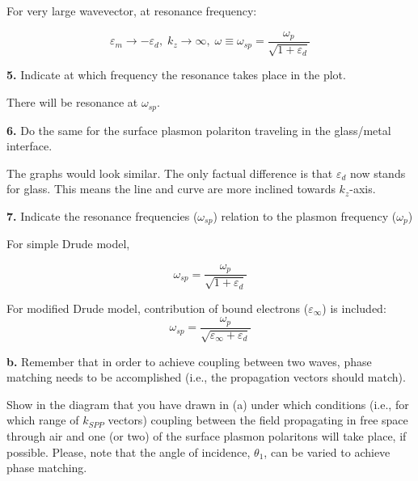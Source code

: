 \documentclass[11pt,a4paper]{article}
\begin{document}
For very large wavevector, at resonance frequency:

\begin{equation}
    \varepsilon_m \to - \varepsilon_d, \; k_z \to \infty, \; \omega \equiv \omega_{sp} = \frac{\omega_p}{\sqrt{1+\varepsilon_d}}
\end{equation}

\begin{displayquote}
    \textbf{5.}  Indicate at which frequency the resonance takes place in the plot. 
    \end{displayquote}

    There will be resonance at $\omega_{sp}$.
    
    \begin{displayquote}
    \textbf{6.}  Do the same for the surface plasmon polariton traveling in the
glass/metal interface.
\end{displayquote}
The graphs would look similar. The only factual difference is that $\varepsilon_d$ now stands for glass. This means the line and curve are more inclined towards $k_z$-axis.

\begin{displayquote}
    \textbf{7.}  Indicate the resonance frequencies ($\omega_{sp}$) relation to the plasmon frequency ($\omega_p$)
\end{displayquote}
For simple Drude model,

\begin{equation}
    \omega_{sp} = \frac{\omega_p}{\sqrt{1+\varepsilon_d}}
\end{equation}

For modified Drude model, contribution of bound electrons ($\varepsilon_{\infty}$)  is included:
\begin{equation}
      \omega_{sp} = \frac{\omega_p}{\sqrt{\varepsilon_{\infty}+\varepsilon_d}}
\end{equation}

\textbf{b. }Remember that in order to achieve coupling between two waves, phase matching needs to be accomplished (i.e., the propagation vectors should match).



\begin{displayquote}
     Show in the diagram that you have drawn in (a) under which conditions (i.e., for which range of $k_{SPP}$ vectors) coupling between the field propagating in free space through air and one (or two) of the surface plasmon polaritons will take place, if possible. Please, note that the angle of incidence, $\theta_1$, can be varied to achieve phase matching.
\end{displayquote}
\end{document}

